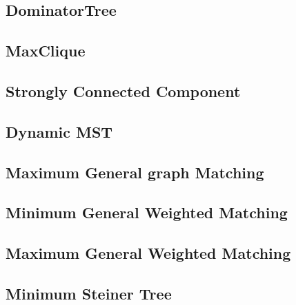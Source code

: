 \documentclass[a4paper,10pt,twocolumn,oneside]{article}
\begin{document}
\subsection{DominatorTree}


\subsection{MaxClique}
% 


%

\subsection{Strongly Connected Component}


\subsection{Dynamic MST}


\subsection{Maximum General graph Matching}


\subsection{Minimum General Weighted Matching}


\subsection{Maximum General Weighted Matching}


\subsection{Minimum Steiner Tree}

\end{document}
